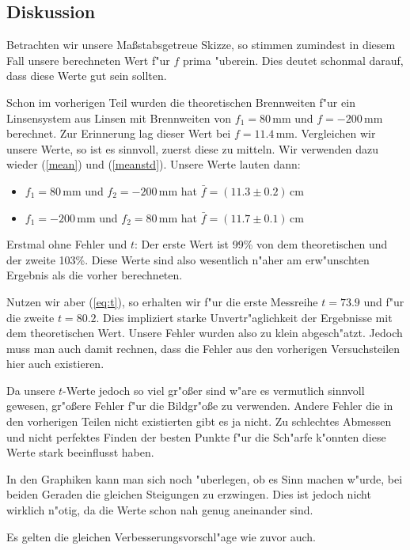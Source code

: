 \documentclass[11pt,a4paper]{article}
\begin{document}
\subsection{Diskussion}

Betrachten wir unsere Ma\ss stabsgetreue Skizze, so stimmen zumindest in diesem Fall unsere berechneten Wert f"ur $f$ prima "uberein. Dies deutet schonmal darauf, dass diese Werte gut sein sollten.

Schon im vorherigen Teil wurden die theoretischen Brennweiten f"ur ein Linsensystem aus Linsen mit Brennweiten von $f_1=80$\,mm und $f=-200$\,mm berechnet. Zur Erinnerung lag dieser Wert bei $f=11.4$\,mm. Vergleichen wir unsere Werte, so ist es sinnvoll, zuerst diese zu mitteln. Wir verwenden dazu wieder (\ref{mean}) und (\ref{meanstd}). Unsere Werte lauten dann:

\begin{itemize}
\item $f_1=80\,$mm und $f_2=-200\,$mm hat $\bar{f}=(11.3\pm0.2)$\,cm
\item $f_1=-200\,$mm und $f_2=80\,$mm hat $\bar{f}=(11.7\pm0.1)$\,cm
\end{itemize}

Erstmal ohne Fehler und $t$: Der erste Wert ist 99\% von dem theoretischen und der zweite 103\%. Diese Werte sind also wesentlich n"aher am erw"unschten Ergebnis als die vorher berechneten.

Nutzen wir aber (\ref{eq:t}), so erhalten wir f"ur die erste Messreihe $t=73.9$ und f"ur die zweite $t=80.2$. Dies impliziert starke Unvertr"aglichkeit der Ergebnisse mit dem theoretischen Wert. Unsere Fehler wurden also zu klein abgesch"atzt. Jedoch muss man auch damit rechnen, dass die Fehler aus den vorherigen Versuchsteilen hier auch existieren.

Da unsere $t$-Werte jedoch so viel gr"o\ss er sind w"are es vermutlich sinnvoll gewesen, gr"o\ss ere Fehler f"ur die Bildgr"o\ss e zu verwenden. Andere Fehler die in den vorherigen Teilen nicht existierten gibt es ja nicht. Zu schlechtes Abmessen und nicht perfektes Finden der besten Punkte f"ur die Sch"arfe k"onnten diese Werte stark beeinflusst haben.

In den Graphiken kann man sich noch "uberlegen, ob es Sinn machen w"urde, bei beiden Geraden die gleichen Steigungen zu erzwingen. Dies ist jedoch nicht wirklich n"otig, da die Werte schon nah genug aneinander sind.

Es gelten die gleichen Verbesserungsvorschl"age wie zuvor auch.
\end{document}
